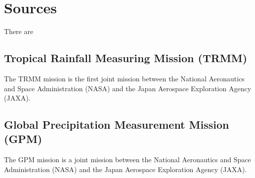 \section{Sources}
There are 
\subsection*{Tropical Rainfall Measuring Mission (TRMM)}
The TRMM mission is the first joint mission between the National Aeronautics and Space Administration (NASA) and the Japan Aerospace Exploration Agency (JAXA).

\subsection*{Global Precipitation Measurement Mission (GPM)}
The GPM mission is a joint mission between the National Aeronautics and Space Administration (NASA) and the Japan Aerospace Exploration Agency (JAXA).
